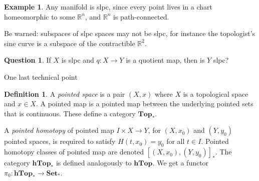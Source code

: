 \documentclass{tufte-handout}
\def\Set {\mathbf{Set}}
\def\Top {\mathbf{Top}}
\def\Ho {\mathbf{hTop}}
\def\RR{\mathbb{R}}
\def\CC{\mathbb{C}}
\theoremstyle{definition}
\newtheorem{lemma}{Lemma}
\newtheorem{definition}{Definition}
\newtheorem{example}{Example}
\newtheorem{q}{Question}
\begin{document}
\begin{example}
Any manifold is slpc, since every point lives in a chart homeomorphic to some $\RR^n$, and $\RR^n$ is path-connected.
\end{example}

Be warned: subspaces of slpc spaces may not be slpc, for instance the topologist's sine curve is a subspace of the contractible $\RR^2$.

\begin{q}
If $X$ is slpc and $q\colon X\to Y$ is a quotient map,
 then is $Y$ slpc?
\end{q}





One last technical point

\begin{definition}
A \emph{pointed space} is a pair $(X,x)$ where $X$ is a topological space and $x\in X$. 
A pointed map is a pointed map between the underlying pointed sets that is continuous.
These define a category $\Top_*$.
\end{definition}

A \emph{pointed homotopy} of pointed map $I\times X\to Y$, for $(X,x_0)$ and $(Y,y_0)$ pointed spaces, is required 
to satisfy $H(t,x_0) =y_0$ for all $t\in I$.
Pointed homotopy classes of pointed map are denoted $[(X,x_0),(Y,y_0)]_*$.
The category $\Ho_*$ is defined analogously to $\Ho$. 
We get a functor $\pi_0\colon \Ho_* \to\Set_*$. 
\end{document}
